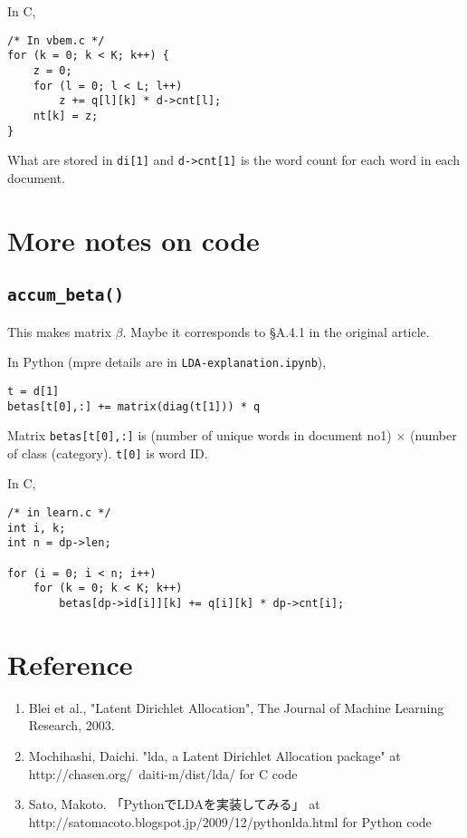 \documentclass[a4paper,10.5pt,dvipdfmx]{jarticle}  %
\begin{document}
In C,
\begin{lstlisting}[style=C]
/* In vbem.c */
for (k = 0; k < K; k++) {
	z = 0;
	for (l = 0; l < L; l++)
		z += q[l][k] * d->cnt[l];
	nt[k] = z;
}
\end{lstlisting}

What are stored in \texttt{di[1]} and \texttt{d->cnt[1]} is the word count for each word in each document.

\section{More notes on code}
\subsection{\texttt{accum\_beta()}}
\noindent
This makes matrix $\beta$. Maybe it corresponds to \S A.4.1 in the original article. \par
In Python (mpre details are in \texttt{LDA-explanation.ipynb}),
\begin{lstlisting}[style=Python]
t = d[1]
betas[t[0],:] += matrix(diag(t[1])) * q 
\end{lstlisting}
Matrix \texttt{betas[t[0],:]} is (number of unique words in document no1) $\times$  (number of class (category). \texttt{t[0]} is word ID.

In C,
\begin{lstlisting}[style=C]
/* in learn.c */
int i, k;
int n = dp->len;

for (i = 0; i < n; i++)
	for (k = 0; k < K; k++)
		betas[dp->id[i]][k] += q[i][k] * dp->cnt[i];
\end{lstlisting}


\section*{Reference}
\begin{enumerate}
	\item Blei et al., "Latent Dirichlet Allocation", The Journal of Machine Learning Research, 2003.
	\item Mochihashi, Daichi. "lda, a Latent Dirichlet Allocation package" at http://chasen.org/~daiti-m/dist/lda/ for C code
	\item Sato, Makoto. 「PythonでLDAを実装してみる」 at http://satomacoto.blogspot.jp/2009/12/pythonlda.html for Python code
\end{enumerate}
\end{document}
